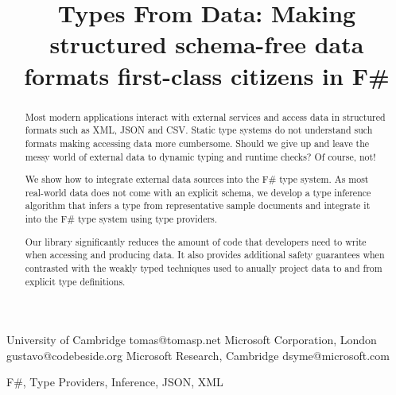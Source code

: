 \documentclass[10pt,preprint,blind,clearpagebib]{sigplanconf}
\newcommand{\doi}[1]{doi:~\href{http://dx.doi.org/#1}{\Hurl{#1}}}
\begin{document}
\setlength{\pdfpageheight}{\paperheight}
\setlength{\pdfpagewidth}{\paperwidth}


\title{Types From Data: \textnormal{Making structured schema-free data formats first-class citizens in F\#}}

           {University of Cambridge}
           {tomas@tomasp.net}
           {Microsoft Corporation, London}
           {gustavo@codebeside.org}
           {Microsoft Research, Cambridge}
           {dsyme@microsoft.com}
\maketitle


\begin{abstract}
Most modern applications interact with external services and access data in structured formats such 
as XML, JSON and CSV. Static type systems do not understand such formats making accessing data more 
cumbersome. Should we give up and leave the messy world of external data to dynamic typing and 
runtime checks? Of course, not!

We show how to integrate external data sources into the F\# type system. As most real-world data
does not come with an explicit schema, we develop a type inference algorithm that infers a type from 
representative sample documents and integrate it into the F\# type system using type providers.

Our library significantly reduces the amount of code that developers need to write when 
accessing and producing data. It also provides additional safety guarantees when contrasted 
with the weakly typed techniques used to anually project data to and from explicit type definitions.
\end{abstract}

\keywords F\#, Type Providers, Inference, JSON, XML
\end{document}
